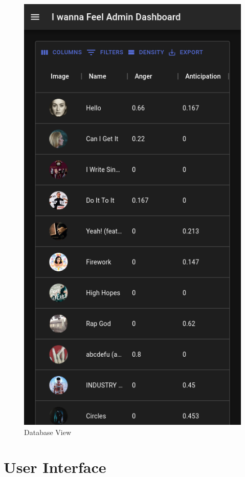 \begin{figure}[H]
\centering
\includegraphics[scale=0.6]{imgs/mobileui3.png}
\caption{Database View}

\label{fig: mobileUI_3}
\end{figure}


\section{User Interface}

